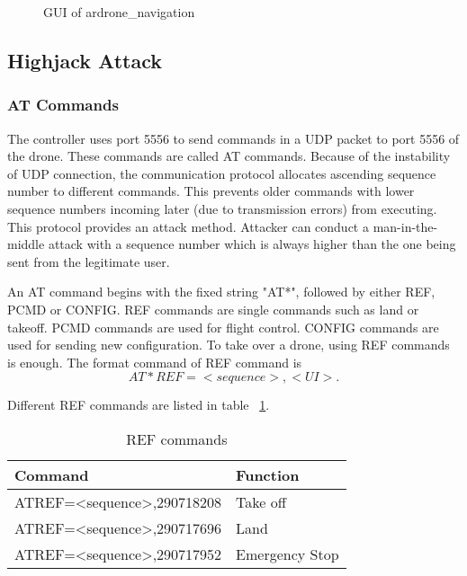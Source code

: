 \documentclass{acm_proc_article-sp}
\newcommand{\upcite}[1]{\textsuperscript{\textsuperscript{\cite{#1}}}}
\begin{document}
\begin{figure}
\centering
{}
\caption{GUI of ardrone\_navigation}
\label{navigation}
\end{figure}


\subsection{Highjack Attack}

\subsubsection{AT Commands}
 The controller uses port 5556 to send commands in a UDP packet to port 5556 of the drone\upcite{dev:guide}. These commands are called AT commands. Because of the instability of UDP connection, the communication protocol allocates ascending sequence number to different commands. This prevents older commands with lower sequence numbers incoming later (due to transmission errors) from executing\upcite{hack:secure}. This protocol provides an attack method. Attacker can conduct a man-in-the-middle attack with a sequence number which is always higher than the one being sent from the legitimate user.

An AT command begins with the fixed string "AT*", followed by either REF, PCMD or CONFIG. REF commands are single commands such as land or takeoff. PCMD commands are used for flight control. CONFIG commands are used for sending new configuration. To take over a drone, using REF commands is enough. The format command of REF command is 
\begin{equation}
  AT*REF=<sequence>,<UI>.
\end{equation}


Different REF commands are listed in table ~\ref{refcom}.

\begin{table}
\centering
\caption{REF commands}
\label{refcom}
\begin{tabular}{@{}ll@{}} \hline
Command                                            & Function       \\ \hline
AT\*REF=\textless{}sequence\textgreater{},290718208 & Take off       \\ \hline
AT\*REF=\textless{}sequence\textgreater{},290717696 & Land           \\ \hline
AT\*REF=\textless{}sequence\textgreater{},290717952 & Emergency Stop \\ \hline
\end{tabular}
\end{table}
\end{document}
